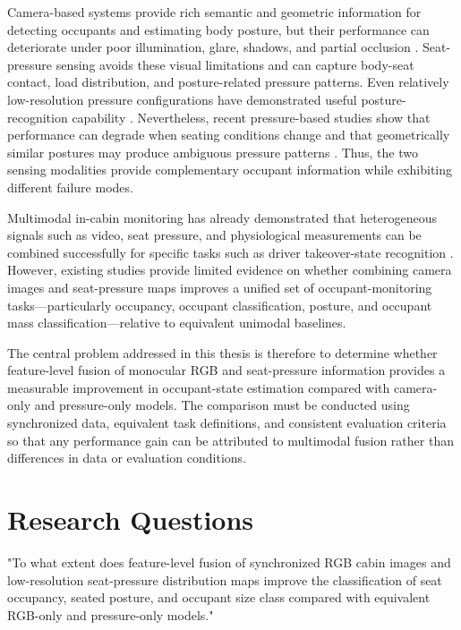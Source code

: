 Camera-based systems provide rich semantic and geometric information for detecting occupants and estimating body posture, 
but their performance can deteriorate under poor illumination, glare, shadows, and partial occlusion \cite{salazar2025dms}. 
Seat-pressure sensing avoids these visual limitations and can capture body-seat contact, load distribution, and posture-related 
pressure patterns. Even relatively low-resolution pressure configurations have demonstrated useful posture-recognition capability
\cite{zhao2021lowrespressure}. Nevertheless, recent pressure-based studies show that performance can degrade when seating 
conditions change and that geometrically similar postures may produce ambiguous pressure patterns \cite{wang2025pressure}. 
Thus, the two sensing modalities provide complementary occupant information while exhibiting different failure modes.

Multimodal in-cabin monitoring has already demonstrated that heterogeneous signals such as video, seat pressure, and 
physiological measurements can be combined successfully for specific tasks such as driver takeover-state recognition
\cite{quan2024ergonomicfusion,teshima2024multimodal,xueetal2019heteromultimodal}. However, existing studies provide limited evidence on whether 
combining camera images and seat-pressure maps improves a unified set of occupant-monitoring tasks—particularly occupancy, 
occupant classification, posture, and occupant mass classification—relative to equivalent unimodal baselines.

The central problem addressed in this thesis is therefore to determine whether feature-level fusion of monocular RGB and seat-pressure 
information provides a measurable improvement in occupant-state estimation compared with camera-only and pressure-only models. 
The comparison must be conducted using synchronized data, equivalent task definitions, and consistent evaluation criteria so that
any performance gain can be attributed to multimodal fusion rather than differences in data or evaluation conditions.





\section{Research Questions}
\label{sec:research-questions}


"To what extent does feature-level fusion of synchronized RGB cabin images and low-resolution 
seat-pressure distribution maps improve the classification of seat occupancy, seated posture, and 
occupant size class compared with equivalent RGB-only and pressure-only models."

